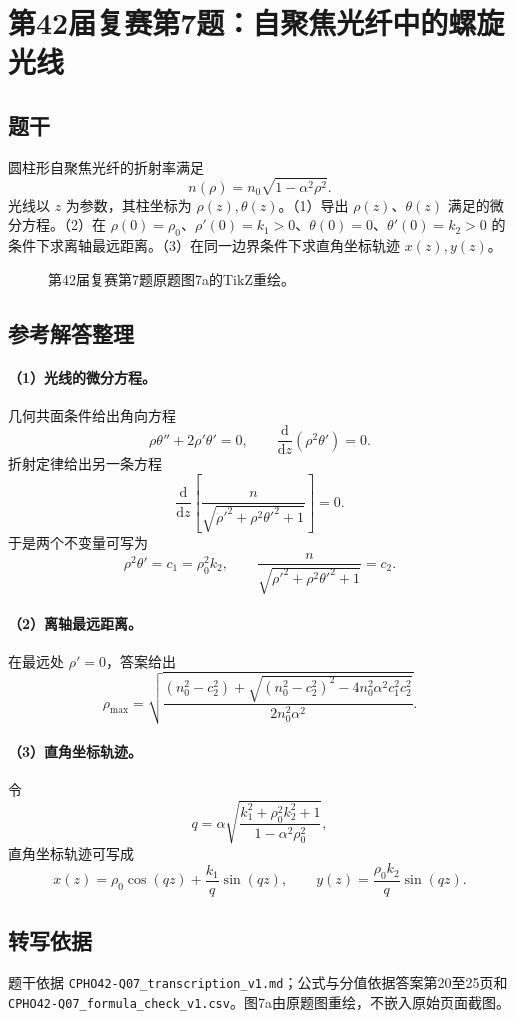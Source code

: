 \section{第42届复赛第7题：自聚焦光纤中的螺旋光线}
\subsection{题干}
圆柱形自聚焦光纤的折射率满足
\[n(\rho)=n_0\sqrt{1-\alpha^2\rho^2}.\]
光线以 $z$ 为参数，其柱坐标为 $\rho(z),\theta(z)$。（1）导出 $\rho(z)$、$\theta(z)$ 满足的微分方程。（2）在 $\rho(0)=\rho_0$、$\rho'(0)=k_1>0$、$\theta(0)=0$、$\theta'(0)=k_2>0$ 的条件下求离轴最远距离。（3）在同一边界条件下求直角坐标轨迹 $x(z),y(z)$。
\begin{figure}[htbp]\centering\caption{第42届复赛第7题原题图7a的TikZ重绘。}\end{figure}
\subsection{参考解答整理}
\paragraph{（1）光线的微分方程。}
几何共面条件给出角向方程
\[\rho\theta''+2\rho'\theta'=0,\qquad \frac{\mathrm d}{\mathrm dz}(\rho^2\theta')=0.\]
折射定律给出另一条方程
\[\frac{\mathrm d}{\mathrm dz}\left[\frac{n}{\sqrt{\rho'^2+\rho^2\theta'^2+1}}\right]=0.\]
于是两个不变量可写为
\[\rho^2\theta'=c_1=\rho_0^2k_2,\qquad
\frac{n}{\sqrt{\rho'^2+\rho^2\theta'^2+1}}=c_2.
\]
\paragraph{（2）离轴最远距离。}
在最远处 $\rho'=0$，答案给出
\[\rho_{\max}=\sqrt{\frac{(n_0^2-c_2^2)+\sqrt{(n_0^2-c_2^2)^2-4n_0^2\alpha^2c_1^2c_2^2}}{2n_0^2\alpha^2}}.\]
\paragraph{（3）直角坐标轨迹。}
令
\[q=\alpha\sqrt{\frac{k_1^2+\rho_0^2k_2^2+1}{1-\alpha^2\rho_0^2}},\]
直角坐标轨迹可写成
\[x(z)=\rho_0\cos(qz)+\frac{k_1}{q}\sin(qz),\qquad
y(z)=\frac{\rho_0k_2}{q}\sin(qz).\]
\subsection{转写依据}
题干依据 \texttt{CPHO42-Q07\_transcription\_v1.md}；公式与分值依据答案第20至25页和 \texttt{CPHO42-Q07\_formula\_check\_v1.csv}。图7a由原题图重绘，不嵌入原始页面截图。
